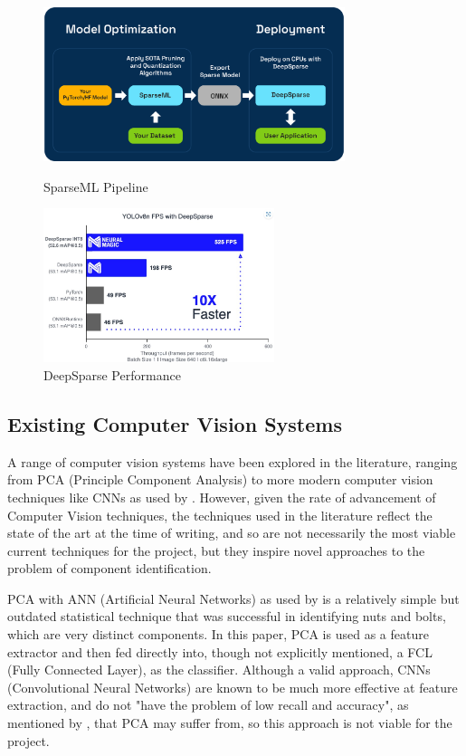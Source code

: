 \begin{figure}[t]
  \begin{minipage}[t]{0.45\textwidth}
    \centering
    \includegraphics[width=\textwidth,height=4.5cm]{imgs/articles/sparseml-workflow.png}
    \caption{SparseML Pipeline \cite{sparseml}}
  \end{minipage}
  \hfill
  \begin{minipage}[t]{0.45\textwidth}
      \centering
      \includegraphics[width=\textwidth,height=4.5cm]{imgs/articles/yoloperf.jpg}
      \caption{DeepSparse Performance \cite{neuralmagic}}
      \end{minipage}
\end{figure}

\subsection{Existing Computer Vision Systems}
A range of computer vision systems have been explored in the literature, ranging from PCA (Principle Component Analysis) \citet{Dhenge2013MechanicalNS} to more modern computer vision techniques like CNNs as used by \citet{Xu2020,s22239079}. However, given the rate of advancement of Computer Vision
techniques, the techniques used in the literature reflect the state of the art at the time of writing, and so are not necessarily the most viable current techniques for the project, but they inspire novel approaches to the problem of component identification.

PCA with ANN (Artificial Neural Networks) as used by \citet{Dhenge2013MechanicalNS} is a relatively simple but outdated statistical technique that was successful in identifying nuts and bolts, which are very distinct components. 
In this paper, PCA is used as a feature extractor and then fed directly into, though not explicitly mentioned, a FCL (Fully Connected Layer), as the classifier. Although a valid approach, CNNs (Convolutional Neural Networks) are known to be much more
effective at feature extraction, and do not "have the problem of low recall and accuracy", as mentioned by \citet{Xu2020}, that PCA may suffer from, so this approach is not viable for the project. 

